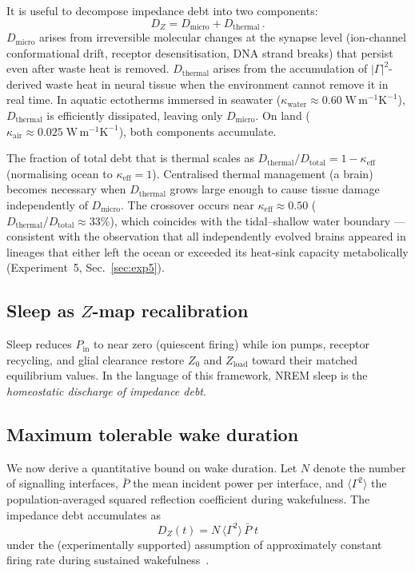 ﻿\documentclass[aps,pre,twocolumn,superscriptaddress,floatfix]{revtex4-2}
\begin{document}
It is useful to decompose impedance debt into two components:
\begin{equation}
  D_Z = D_{\mathrm{micro}} + D_{\mathrm{thermal}}\,.
  \label{eq:DZ-decomp}
\end{equation}
$D_{\mathrm{micro}}$ arises from irreversible molecular changes
at the synapse level (ion-channel conformational drift,
receptor desensitisation, DNA strand breaks) that persist
even after waste heat is removed.
$D_{\mathrm{thermal}}$ arises from the accumulation of
$|\Gamma|^2$-derived waste heat in neural tissue when the
environment cannot remove it in real time.
In aquatic ectotherms immersed in seawater
($\kappa_{\mathrm{water}} \approx 0.60\;\mathrm{W\,m^{-1}K^{-1}}$),
$D_{\mathrm{thermal}}$ is efficiently dissipated,
leaving only $D_{\mathrm{micro}}$.
On land ($\kappa_{\mathrm{air}} \approx 0.025\;\mathrm{W\,m^{-1}K^{-1}}$),
both components accumulate.

The fraction of total debt that is thermal scales as
$D_{\mathrm{thermal}}/D_{\mathrm{total}} = 1 - \kappa_{\mathrm{eff}}$
(normalising ocean to $\kappa_{\mathrm{eff}} = 1$).
Centralised thermal management (a brain) becomes necessary
when $D_{\mathrm{thermal}}$ grows large enough to cause
tissue damage independently of $D_{\mathrm{micro}}$.
The crossover occurs near
$\kappa_{\mathrm{eff}} \approx 0.50$
($D_{\mathrm{thermal}}/D_{\mathrm{total}} \approx 33\%$),
which coincides with the tidal--shallow water boundary
---consistent with the observation that all independently
evolved brains appeared in lineages that either left the
ocean or exceeded its heat-sink capacity metabolically
(Experiment~5, Sec.~\ref{sec:exp5}).

\subsection{Sleep as $Z$-map recalibration}

Sleep reduces $P_{\mathrm{in}}$ to near zero (quiescent firing)
while ion pumps, receptor recycling, and glial clearance
restore $Z_0$ and $Z_{\mathrm{load}}$ toward their
matched equilibrium values.
In the language of this framework, NREM sleep is the
\emph{homeostatic discharge of impedance debt}.


\subsection{Maximum tolerable wake duration}

We now derive a quantitative bound on wake duration.
Let $N$ denote the number of signalling interfaces,
$\bar{P}$ the mean incident power per interface,
and $\langle\Gamma^2\rangle$ the population-averaged
squared reflection coefficient during wakefulness.
The impedance debt accumulates as
\begin{equation}
  D_Z(t) = N\,\langle\Gamma^2\rangle\,\bar{P}\; t
  \label{eq:DZ-linear}
\end{equation}
under the (experimentally supported) assumption of
approximately constant firing rate during sustained
wakefulness~\cite{Karbowski2009}.
\end{document}
